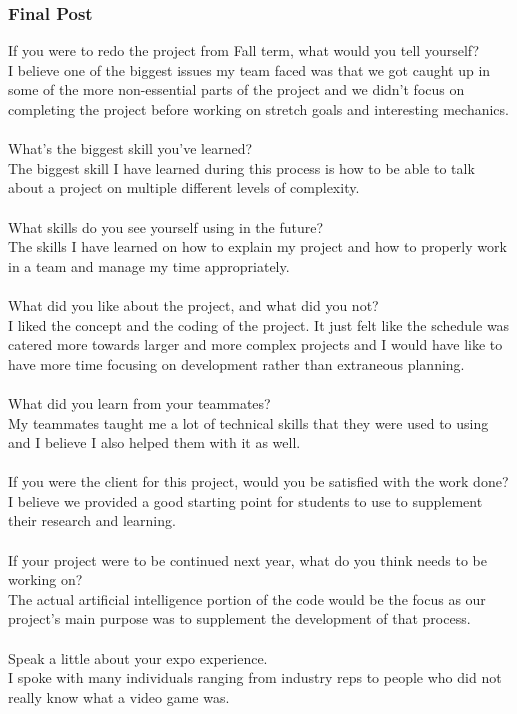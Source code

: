 \subsubsection{Final Post}
If you were to redo the project from Fall term, what would you tell yourself?\\
I believe one of the biggest issues my team faced was that we got caught up in some of the more non-essential parts of the project and we didn't focus on completing the project before working on stretch goals and interesting mechanics.\\
\\
What's the biggest skill you've learned?\\
The biggest skill I have learned during this process is how to be able to talk about a project on multiple different levels of complexity.\\
\\
What skills do you see yourself using in the future?\\
The skills I have learned on how to explain my project and how to properly work in a team and manage my time appropriately.\\
\\
What did you like about the project, and what did you not?\\
I liked the concept and the coding of the project. It just felt like the schedule was catered more towards larger and more complex projects and I would have like to have more time focusing on development rather than extraneous planning.\\
\\
What did you learn from your teammates?\\
My teammates taught me a lot of technical skills that they were used to using and I believe I also helped them with it as well.\\
\\
If you were the client for this project, would you be satisfied with the work done?\\
I believe we provided a good starting point for students to use to supplement their research and learning.\\
\\
If your project were to be continued next year, what do you think needs to be working on?\\
The actual artificial intelligence portion of the code would be the focus as our project's main purpose was to supplement the development of that process.\\
\\
Speak a little about your expo experience.\\
I spoke with many individuals ranging from industry reps to people who did not really know what a video game was.\\